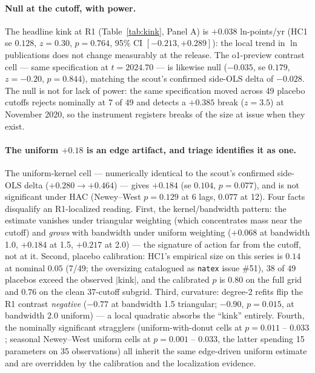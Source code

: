 \documentclass[11pt]{article}
\newcommand{\natex}{\texttt{natex}}
\begin{document}
\paragraph{Null at the cutoff, with power.} The headline kink at R1
(Table~\ref{tab:kink}, Panel A) is $+0.038$ ln-points/yr (HC1 se $0.128$,
$z=0.30$, $p=0.764$, 95\% CI $[-0.213, +0.289]$): the local trend in $\ln$
publications does not change measurably at the release. The o1-preview
contrast cell --- same specification at $t=2024.70$ --- is likewise null
($-0.035$, se $0.179$, $z=-0.20$, $p=0.844$), matching the scout's confirmed
side-OLS delta of $-0.028$. The null is not for lack of power: the same
specification moved across 49 placebo cutoffs rejects nominally at 7 of 49
and detects a $+0.385$ break ($z=3.5$) at November 2020, so the instrument
registers breaks of the size at issue when they exist.

\paragraph{The uniform $+0.18$ is an edge artifact, and triage identifies
it as one.} The uniform-kernel cell --- numerically identical to the scout's
confirmed side-OLS delta ($+0.280\rightarrow+0.464$) --- gives $+0.184$ (se
$0.104$, $p=0.077$), and is not significant under HAC (Newey--West $p=0.129$
at 6 lags, $0.077$ at 12). Four facts disqualify an R1-localized reading.
First, the kernel/bandwidth pattern: the estimate vanishes under triangular
weighting (which concentrates mass near the cutoff) and \emph{grows} with
bandwidth under uniform weighting ($+0.068$ at bandwidth 1.0, $+0.184$ at
1.5, $+0.217$ at 2.0) --- the signature of action far from the cutoff, not
at it. Second, placebo calibration: HC1's empirical size on this series is
$0.14$ at nominal $0.05$ (7/49; the oversizing catalogued as \natex{} issue
\#51), 38 of 49 placebos exceed the observed $|$kink$|$, and the calibrated
$p$ is $0.80$ on the full grid and $0.76$ on the clean 37-cutoff subgrid.
Third, curvature: degree-2 refits flip the R1 contrast \emph{negative}
($-0.77$ at bandwidth 1.5 triangular; $-0.90$, $p=0.015$, at bandwidth 2.0
uniform) --- a local quadratic absorbs the ``kink'' entirely. Fourth, the
nominally significant stragglers (uniform-with-donut cells at $p=0.011$ --
$0.033$; seasonal Newey--West uniform cells at $p=0.001$ -- $0.033$, the
latter spending 15 parameters on 35 observations) all inherit the same
edge-driven uniform estimate and are overridden by the calibration and the
localization evidence.
\end{document}

